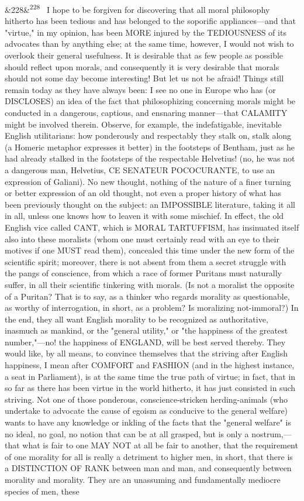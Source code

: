 \documentclass[12pt]{article}
\newcommand{\para}[1][]{\par\noindent\ifx&#1&\else\textsuperscript{\footnotesize #1}~\fi}
\begin{document}
\para[228] I hope to be forgiven for discovering that all moral philosophy hitherto has been tedious and has belonged to the soporific appliances---and that "virtue," in my opinion, has been MORE injured by the TEDIOUSNESS of its advocates than by anything else; at the same time, however, I would not wish to overlook their general usefulness. It is desirable that as few people as possible should reflect upon morals, and consequently it is very desirable that morals should not some day become interesting! But let us not be afraid! Things still remain today as they have always been: I see no one in Europe who has (or DISCLOSES) an idea of the fact that philosophizing concerning morals might be conducted in a dangerous, captious, and ensnaring manner---that CALAMITY might be involved therein. Observe, for example, the indefatigable, inevitable English utilitarians: how ponderously and respectably they stalk on, stalk along (a Homeric metaphor expresses it better) in the footsteps of Bentham, just as he had already stalked in the footsteps of the respectable Helvetius! (no, he was not a dangerous man, Helvetius, CE SENATEUR POCOCURANTE, to use an expression of Galiani). No new thought, nothing of the nature of a finer turning or better expression of an old thought, not even a proper history of what has been previously thought on the subject: an IMPOSSIBLE literature, taking it all in all, unless one knows how to leaven it with some mischief. In effect, the old English vice called CANT, which is MORAL TARTUFFISM, has insinuated itself also into these moralists (whom one must certainly read with an eye to their motives if one MUST read them), concealed this time under the new form of the scientific spirit; moreover, there is not absent from them a secret struggle with the pangs of conscience, from which a race of former Puritans must naturally suffer, in all their scientific tinkering with morals. (Is not a moralist the opposite of a Puritan? That is to say, as a thinker who regards morality as questionable, as worthy of interrogation, in short, as a problem? Is moralizing not-immoral?) In the end, they all want English morality to be recognized as authoritative, inasmuch as mankind, or the "general utility," or "the happiness of the greatest number,"---no! the happiness of ENGLAND, will be best served thereby. They would like, by all means, to convince themselves that the striving after English happiness, I mean after COMFORT and FASHION (and in the highest instance, a seat in Parliament), is at the same time the true path of virtue; in fact, that in so far as there has been virtue in the world hitherto, it has just consisted in such striving. Not one of those ponderous, conscience-stricken herding-animals (who undertake to advocate the cause of egoism as conducive to the general welfare) wants to have any knowledge or inkling of the facts that the "general welfare" is no ideal, no goal, no notion that can be at all grasped, but is only a nostrum,---that what is fair to one MAY NOT at all be fair to another, that the requirement of one morality for all is really a detriment to higher men, in short, that there is a DISTINCTION OF RANK between man and man, and consequently between morality and morality. They are an unassuming and fundamentally mediocre species of men, these 
\end{document}
